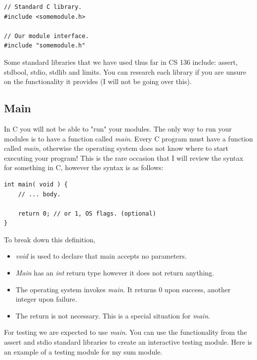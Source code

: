 \documentclass[12pt,extarticle]{article}
\begin{document}
\lstset {
	language=c
}
\begin{lstlisting}
// Standard C library.
#include <somemodule.h>

// Our module interface.
#include "somemodule.h"
\end{lstlisting}

Some standard libraries that we have used thus far in CS 136 include: assert, stdbool, stdio, stdlib and limits. You can research each library if you are unsure on the functionality it provides (I will not be going over this).

\subsection{Main}

In C you will not be able to "run" your modules. The only way to run your modules is to have a function called \emph{main}. Every C program must have a function called \emph{main}, otherwise the operating system does not know where to start executing your program! This is the rare occasion that I will review the syntax for something in C, however the syntax is as follows:\\

\lstset {
	language=c
}
\begin{lstlisting}
int main( void ) {
	// ... body.	
	
	return 0; // or 1, OS flags. (optional)
}
\end{lstlisting}

To break down this definition,

\begin{itemize}

\item \emph{void} is used to declare that main accepts no parameters.
\item \emph{Main} has an \emph{int} return type however it does not return anything.
\item The operating system invokes \emph{main}. It returns 0 upon success, another integer upon failure.
\item The return is not necessary. This is a special situation for \emph{main}.

\end{itemize}

For testing we are expected to use \emph{main}. You can use the functionality from the assert and stdio standard libraries to create an interactive testing module. Here is an example of a testing module for my sum module.\\
\end{document}
